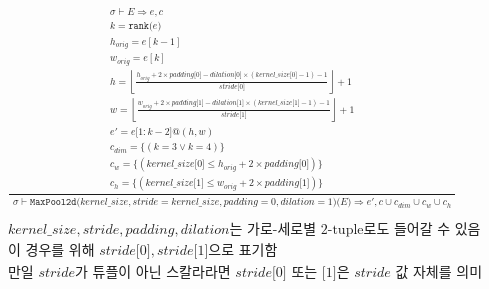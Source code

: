 \documentclass{article}
\makeatletter
\newcommand{\x}{\times}
\newcommand{\Rar}{\Rightarrow}
\newcommand{\mtt}[1]{\mathtt{#1}}
\newcommand{\op}[2]{\mtt{#1(}#2\mtt{)}}
\newcommand{\module}[3]{\mtt{#1(}#2\mtt{)(}#3\mtt{)}}
\newcommand{\conc}{\mtt{@}}
\newcommand{\ind}[1]{\mtt{[}#1\mtt{]}}
\newcommand{\indr}[2]{\mtt{[}#1\mtt{:}#2\mtt{]}}
\makeatother
\begin{document}
\begin{align*}
  \frac
  {
    \begin{array}{l}
      \sigma \vdash E \Rar e, c \\
      k = \op{rank}{e} \\
      h_{orig} = e[k-1] \\
      w_{orig} = e[k] \\
      h = \left\lfloor \frac{h_{orig} + 2 \x padding \ind{0} - dilation \ind{0}
        \x (kernel\_size \ind{0} - 1) - 1}{stride \ind{0}} \right\rfloor + 1 \\
      w = \left\lfloor \frac{w_{orig} + 2 \x padding \ind{1} - dilation \ind{1}
        \x (kernel\_size \ind{1} - 1) - 1}{stride \ind{1}} \right\rfloor + 1 \\
      e' = e\indr{1}{k-2} \conc (h, w) \\
      c_{dim} = \{ (k = 3 \lor k = 4) \} \\
      c_w = \{ (kernel\_size\ind{0} \leq h_{orig} + 2 \x padding \ind{0}) \} \\
      c_h = \{ (kernel\_size\ind{1} \leq w_{orig} + 2 \x padding \ind{1}) \} 
    \end{array}
  }
  {
    \begin{array}{c}
      \sigma \vdash \module{MaxPool2d}{kernel\_size, stride=kernel\_size,
        padding=0, dilation=1}{E}
        \Rar e', c \cup c_{dim} \cup c_w \cup c_h 
    \end{array}
  } \\
  \\
  \text{$kernel\_size, stride, padding, dilation$는 가로-세로별 2-tuple로도 들어갈
  수 있음} \\
  \text{이 경우를 위해 $stride\ind{0}, stride\ind{1}$으로 표기함} \\
  \text{만일 $stride$가 튜플이 아닌 스칼라라면 $stride\ind{0}$ 또는 $\ind{1}$은
    $stride$ 값 자체를 의미}
\end{align*}
\end{document}

